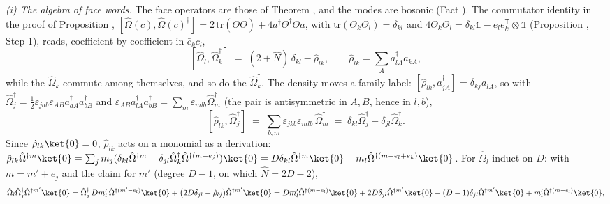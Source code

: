 \emph{(i) The algebra of face words.} The face operators are those of Theorem , and the modes are bosonic (Fact ). The commutator identity in the proof of Proposition , $[\hat\Omega(c), \hat\Omega(c)^{\dagger}] = 2\,\mathrm{tr}(\Theta\bar\Theta) + 4a^{\dagger}\Theta^{\dagger}\Theta a$, with $\mathrm{tr}(\Theta_{k}\Theta_{l}) = \delta_{kl}$ and $4\Theta_{k}\Theta_{l} = \delta_{kl}\mathbb{1} - e_{l}e_{k}^{\mathsf T}\otimes\mathbb{1}$ (Proposition , Step 1), reads, coefficient by coefficient in $\bar{c}_{k}c_{l}$,
\[
[\hat\Omega_{l}, \hat\Omega_{k}^{\dagger}] \;=\; (2 + \hat{N})\,\delta_{kl} - \hat\rho_{lk},
\qquad \hat\rho_{lk} = \textstyle\sum_{A}a_{lA}^{\dagger}a_{kA},
\]
while the $\hat\Omega_{k}$ commute among themselves, and so do the $\hat\Omega_{k}^{\dagger}$. The density moves a family label: $[\hat\rho_{lk}, a_{jA}^{\dagger}] = \delta_{kj}a_{lA}^{\dagger}$, so with $\hat\Omega_{j}^{\dagger} = \tfrac12\varepsilon_{jab}\varepsilon_{AB}a_{aA}^{\dagger}a_{bB}^{\dagger}$ and $\varepsilon_{AB}a_{lA}^{\dagger}a_{bB}^{\dagger} = \sum_{m}\varepsilon_{mlb}\hat\Omega_{m}^{\dagger}$ (the pair is antisymmetric in $A, B$, hence in $l, b$),
\[
[\hat\rho_{lk}, \hat\Omega_{j}^{\dagger}] \;=\; \textstyle\sum_{b,m}\varepsilon_{jkb}\varepsilon_{mlb}\,\hat\Omega_{m}^{\dagger} \;=\; \delta_{kl}\hat\Omega_{j}^{\dagger} - \delta_{jl}\hat\Omega_{k}^{\dagger}.
\]
Since $\hat\rho_{lk}\ket{0} = 0$, $\hat\rho_{lk}$ acts on a monomial as a derivation: $\hat\rho_{lk}\hat\Omega^{\dagger m}\ket{0} = \sum_{j}m_{j}(\delta_{kl}\hat\Omega^{\dagger m} - \delta_{jl}\hat\Omega_{k}^{\dagger}\hat\Omega^{\dagger(m - e_{j})})\ket{0} = D\delta_{kl}\hat\Omega^{\dagger m}\ket{0} - m_{l}\hat\Omega^{\dagger(m - e_{l} + e_{k})}\ket{0}$. For $\hat\Omega_{l}$ induct on $D$: with $m = m' + e_{j}$ and the claim for $m'$ (degree $D - 1$, on which $\hat{N} = 2D - 2$),
\[
\hat\Omega_{l}\hat\Omega_{j}^{\dagger}\hat\Omega^{\dagger m'}\ket{0}
= \hat\Omega_{j}^{\dagger}\,D m'_{l}\,\hat\Omega^{\dagger(m' - e_{l})}\ket{0} + \bigl(2D\delta_{jl} - \hat\rho_{lj}\bigr)\hat\Omega^{\dagger m'}\ket{0}
= D m'_{l}\hat\Omega^{\dagger(m - e_{l})}\ket{0} + 2D\delta_{jl}\hat\Omega^{\dagger m'}\ket{0} - (D - 1)\delta_{jl}\hat\Omega^{\dagger m'}\ket{0} + m'_{l}\hat\Omega^{\dagger(m - e_{l})}\ket{0},
\]

